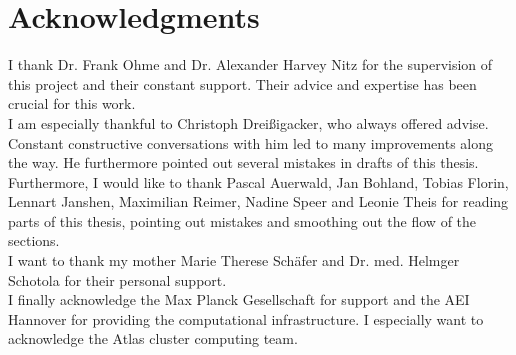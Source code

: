 \section{Acknowledgments}
I thank Dr. Frank Ohme and Dr. Alexander Harvey Nitz for the supervision of this project and their constant support. Their advice and expertise has been crucial for this work.\\
I am especially thankful to Christoph Dreißigacker, who always offered advise. Constant constructive conversations with him led to many improvements along the way. He furthermore pointed out several mistakes in drafts of this thesis.\\
Furthermore, I would like to thank Pascal Auerwald, Jan Bohland, Tobias Florin, Lennart Janshen, Maximilian Reimer, Nadine Speer and Leonie Theis for reading parts of this thesis, pointing out mistakes and smoothing out the flow of the sections.\\
I want to thank my mother Marie Therese Schäfer and Dr. med. Helmger Schotola for their personal support.\\
I finally acknowledge the Max Planck Gesellschaft for support and the AEI Hannover for providing the computational infrastructure. I especially want to acknowledge the Atlas cluster computing team.